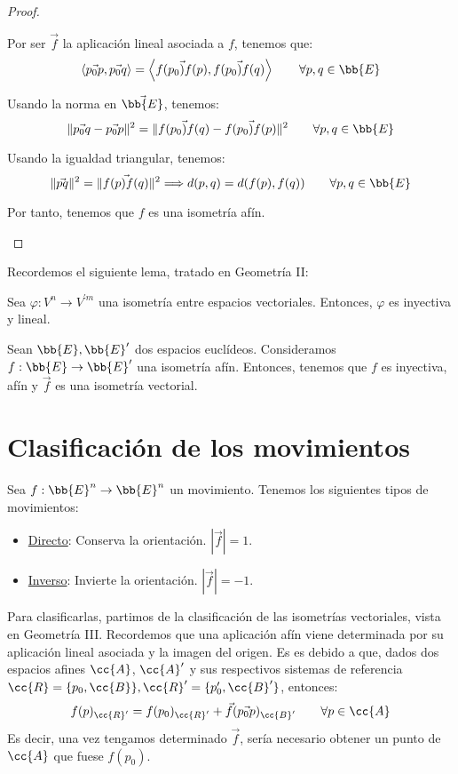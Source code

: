 \begin{proof}
\begin{description}
        Por ser $\vec{f}$ la aplicación lineal asociada a $f$, tenemos que:
        \begin{equation*}
            \langle \vec{p_0p},\vec{p_0q}\rangle = \left\langle \vec{f(p_0)f(p)},\vec{f(p_0)f(q)}\right\rangle \qquad \forall p,q\in {\bb{E}}
        \end{equation*}

        Usando la norma en $\vec{\bb{E}}$, tenemos:
        \begin{equation*}
            \|\vec{p_0q} - \vec{p_0p}\|^2
            = \|\vec{f(p_0)f(q)} -  \vec{f(p_0)f(p)}\|^2  \qquad \forall p,q\in {\bb{E}}
        \end{equation*}

        Usando la igualdad triangular, tenemos:
        \begin{equation*}
            \|\vec{pq}\|^2
            = \|\vec{f(p)f(q)}\|^2 \Longrightarrow d(p,q)=d(f(p), f(q))  \qquad \forall p,q\in {\bb{E}}
        \end{equation*}

        Por tanto, tenemos que $f$ es una isometría afín.
    \end{description}
\end{proof}

Recordemos el siguiente lema, tratado en Geometría II:
\begin{lema}
    Sea $\varphi:V^n\to V^{'m}$ una isometría entre espacios vectoriales. Entonces, $\varphi$ es inyectiva y lineal.
\end{lema}
\begin{coro}
    Sean $\bb{E},\bb{E}'$ dos espacios euclídeos. Consideramos $f:\bb{E}\to \bb{E}'$ una isometría afín. Entonces, tenemos que $f$ es inyectiva, afín y $\vec{f}$ es una isometría vectorial.
\end{coro}

\section{Clasificación de los movimientos}
Sea $f:\bb{E}^n\to \bb{E}^n$ un movimiento. Tenemos los siguientes tipos de movimientos:
\begin{itemize}
    \item \ul{Directo}: Conserva la orientación. $|\vec{f}|=1$.
    \item \ul{Inverso}: Invierte la orientación. $|\vec{f}|=-1$.
\end{itemize}
Para clasificarlas, partimos de la clasificación de las isometrías vectoriales, vista en Geometría III. Recordemos que una aplicación afín viene determinada por su aplicación lineal asociada y la imagen del origen. Es es debido a que, dados dos espacios afines $\cc{A}$, $\cc{A}'$ y sus respectivos sistemas de referencia $\cc{R}=\{p_0,\cc{B}\}, \cc{R}'=\{p_0',\cc{B}'\}$, entonces:
\begin{equation*}
    f(p)_{\cc{R}'} = f(p_0)_{\cc{R}'} + \vec{f}(\vec{p_0p})_{\cc{B}'} \qquad \forall p\in \cc{A}
\end{equation*}
Es decir, una vez tengamos determinado $\vec{f}$, sería necesario obtener un punto de $\cc{A}$ que fuese $f(p_0)$.

